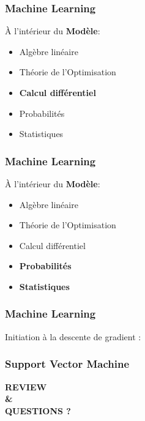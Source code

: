 \documentclass{formation}
\begin{document}
\begin{frame}
  \frametitle{Machine Learning}
  \begin{minipage}[c]{0.41\linewidth}
    À l'intérieur du \textbf{Modèle}:
    \begin{itemize}
    \item Algèbre linéaire
    \item Théorie de l'Optimisation
    \item \textbf{Calcul différentiel}
    \item Probabilités
    \item Statistiques
    \end{itemize}
  \end{minipage}\hfill
  \begin{minipage}[c]{0.58\linewidth}
  \end{minipage}\hfill
\end{frame}

\begin{frame}
  \frametitle{Machine Learning}
  \begin{minipage}[c]{0.41\linewidth}
    À l'intérieur du \textbf{Modèle}:
    \begin{itemize}
    \item Algèbre linéaire
    \item Théorie de l'Optimisation
    \item Calcul différentiel
    \item \textbf{Probabilités}
    \item \textbf{Statistiques}
    \end{itemize}
  \end{minipage}\hfill
  \begin{minipage}[c]{0.58\linewidth}
  \end{minipage}\hfill
\end{frame}

\begin{frame}
  \frametitle{Machine Learning}
  Initiation à la descente de gradient :
\end{frame}

\begin{frame}
  \frametitle{Support Vector Machine}
  \begin{center}
   \textbf{REVIEW \\ \& \\ QUESTIONS ?}
  \end{center}
\end{frame}
\end{document}
